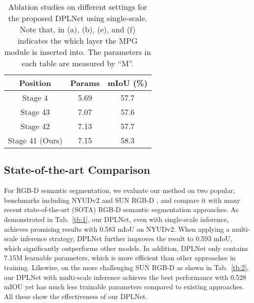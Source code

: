 \documentclass[10pt,twocolumn,letterpaper]{article}
\begin{document}
\begin{table*}[h]
\begin{subtable}[h]{0.33\textwidth}
{        \begin{tabular}{c c c c} \hline
        \multicolumn{2}{c}{{Position}} &{Params} &{mIoU (\%)}
        \\
        \hline\hline
        \multicolumn{2}{c}{Stage 4}  &{5.69}  &57.7 \\
        \multicolumn{2}{c}{Stage 43}  &{7.07}  &57.6 \\
        \multicolumn{2}{c}{Stage 42}  &{7.13}  &57.7 \\
        \multicolumn{2}{c}{Stage 41 (Ours)}  &{7.15}  &58.3
        \\
        \hline
        \end{tabular}
        \label{tb:6(f)}
        }
    \end{subtable}
     \caption{Ablation studies on different settings for the proposed DPLNet using single-scale. Note that, {} in (a), (b), (e), and (f) indicates the which layer the MPG module is inserted into. The parameters in each table are measured by ``M''.}
     \label{tb:6}
\end{table*}

\subsection{State-of-the-art Comparison}
\label{4.2}
 For RGB-D semantic segmentation, we evaluate our method on two popular, benchmarks including NYUDv2 \cite{nyuv2} and SUN RGB-D \cite{sunrgbd}, and compare it with many recent state-of-the-art (SOTA) RGB-D semantic segmentation approaches. As demonstrated in Tab.~\ref{tb:1}, our DPLNet, even with single-scale inference, achieves promising results with 0.583 mIoU on NYUDv2. When applying a multi-scale inference strategy, DPLNet further improves the result to 0.593 mIoU, which significantly outperforms other models. In addition, DPLNet only contains 7.15M learnable parameters, which is more efficient than other approaches in training. Likewise, on the more challenging SUN RGB-D as shown in Tab.~\ref{tb:2}, our DPLNet with multi-scale inference achieves the best performance with 0.528 mIOU yet has much less trainable parameters compared to existing approaches. All these show the effectiveness of our DPLNet.
\end{document}
